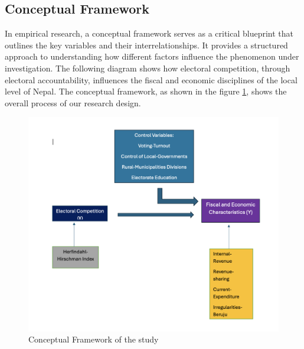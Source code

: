 \subsection{Conceptual Framework}
In empirical research, a conceptual framework serves as a critical blueprint that outlines the key variables and their interrelationships. It provides a structured approach to understanding how different factors influence the phenomenon under investigation. The following diagram shows how electoral competition, through electoral accountability, influences the fiscal and economic disciplines of the local level of Nepal. The conceptual framework, as shown in the figure \ref{Conceptual Framework}, shows the overall process of our research design.
\newpage
\begin{figure}[h]
\centering
\hspace{-1.2cm}
\includegraphics[width = 170mm, scale = 0.4]{figure/Conframe.png}
\caption{Conceptual Framework of the study}
\label{Conceptual Framework}
\end{figure}
